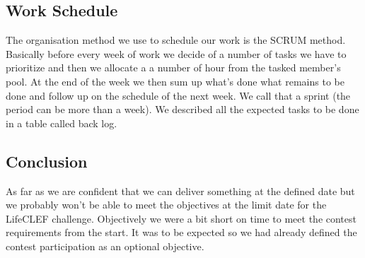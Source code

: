 \documentclass[12pt]{article}
\begin{document}
\subsection*{Work Schedule}
The organisation method we use to schedule our work is the SCRUM method. Basically before every week of work we decide of a number of tasks we have to prioritize and then we allocate a a number of hour from the tasked member's pool. At the end of the week we then sum up what's done what remains to be done and follow up on the schedule of the next week. We call that a sprint (the period can be more than a week).
We described all the expected tasks to be done in a table called back log.


\subsection*{Conclusion}
As far as we are confident that we can deliver something at the defined date but we probably won't be able to meet the objectives at the limit date for the LifeCLEF challenge. Objectively we were a bit short on time to meet the contest requirements from the start. It was to be expected so we had already defined the contest participation  as an optional objective.
\end{document}
